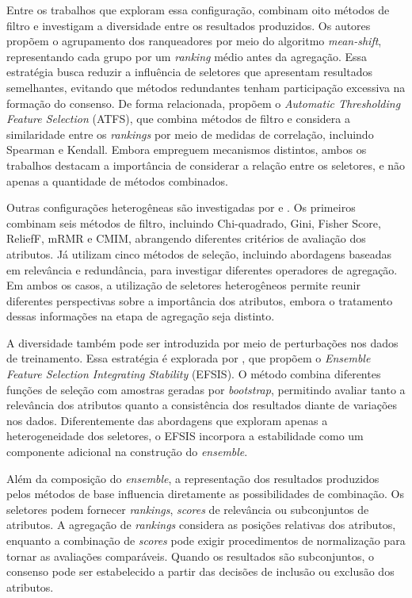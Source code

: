 Entre os trabalhos que exploram essa configuração,  combinam oito métodos de filtro e investigam a diversidade entre os resultados produzidos. Os autores propõem o agrupamento dos ranqueadores por meio do algoritmo \textit{mean-shift}, representando cada grupo por um \textit{ranking} médio antes da agregação. Essa estratégia busca reduzir a influência de seletores que apresentam resultados semelhantes, evitando que métodos redundantes tenham participação excessiva na formação do consenso. De forma relacionada,  propõem o \textit{Automatic Thresholding Feature Selection} (ATFS), que combina métodos de filtro e considera a similaridade entre os \textit{rankings} por meio de medidas de correlação, incluindo Spearman e Kendall. Embora empreguem mecanismos distintos, ambos os trabalhos destacam a importância de considerar a relação entre os seletores, e não apenas a quantidade de métodos combinados.

Outras configurações heterogêneas são investigadas por  e . Os primeiros combinam seis métodos de filtro, incluindo Chi-quadrado, Gini, Fisher Score, ReliefF, mRMR e CMIM, abrangendo diferentes critérios de avaliação dos atributos. Já  utilizam cinco métodos de seleção, incluindo abordagens baseadas em relevância e redundância, para investigar diferentes operadores de agregação. Em ambos os casos, a utilização de seletores heterogêneos permite reunir diferentes perspectivas sobre a importância dos atributos, embora o tratamento dessas informações na etapa de agregação seja distinto.

A diversidade também pode ser introduzida por meio de perturbações nos dados de treinamento. Essa estratégia é explorada por , que propõem o \textit{Ensemble Feature Selection Integrating Stability} (EFSIS). O método combina diferentes funções de seleção com amostras geradas por \textit{bootstrap}, permitindo avaliar tanto a relevância dos atributos quanto a consistência dos resultados diante de variações nos dados. Diferentemente das abordagens que exploram apenas a heterogeneidade dos seletores, o EFSIS incorpora a estabilidade como um componente adicional na construção do \textit{ensemble}.

Além da composição do \textit{ensemble}, a representação dos resultados produzidos pelos métodos de base influencia diretamente as possibilidades de combinação. Os seletores podem fornecer \textit{rankings}, \textit{scores} de relevância ou subconjuntos de atributos. A agregação de \textit{rankings} considera as posições relativas dos atributos, enquanto a combinação de \textit{scores} pode exigir procedimentos de normalização para tornar as avaliações comparáveis. Quando os resultados são subconjuntos, o consenso pode ser estabelecido a partir das decisões de inclusão ou exclusão dos atributos.

